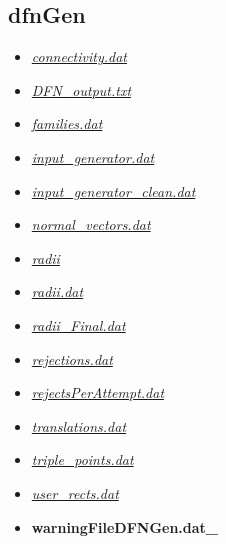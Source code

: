\documentclass[letterpaper,10pt,english]{sphinxmanual}
\begin{document}
\subsection{dfnGen}
\label{output:dfngen}\begin{itemize}
\item {} 
{\hyperref[output:connectivity-dat]{\emph{connectivity.dat}}}

\item {} 
{\hyperref[output:dfn-output-txt]{\emph{DFN\_output.txt}}}

\item {} 
{\hyperref[output:families-dat]{\emph{families.dat}}}

\item {} 
{\hyperref[output:input-generator-dat]{\emph{input\_generator.dat}}}

\item {} 
{\hyperref[output:input-generator-clean-dat]{\emph{input\_generator\_clean.dat}}}

\item {} 
{\hyperref[output:normal-vectors-dat]{\emph{normal\_vectors.dat}}}

\item {} 
{\hyperref[output:radii]{\emph{radii}}}

\item {} 
{\hyperref[output:radii-dat]{\emph{radii.dat}}}

\item {} 
{\hyperref[output:radii-final-dat]{\emph{radii\_Final.dat}}}

\item {} 
{\hyperref[output:rejections-dat]{\emph{rejections.dat}}}

\item {} 
{\hyperref[output:rejectsperattempt-dat]{\emph{rejectsPerAttempt.dat}}}

\item {} 
{\hyperref[output:translations-dat]{\emph{translations.dat}}}

\item {} 
{\hyperref[output:triple-points-dat]{\emph{triple\_points.dat}}}

\item {} 
{\hyperref[output:user-rects-dat]{\emph{user\_rects.dat}}}

\item {} 
{\color{red}\bfseries{}warningFileDFNGen.dat\_}

\end{itemize}
\end{document}
